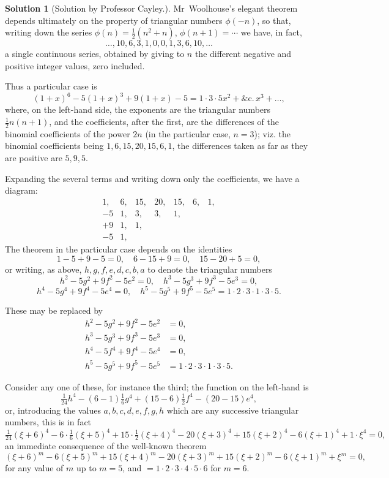 \documentclass[11pt,a4paper]{article}
\theoremstyle{definition}
\newtheorem*{solution}{Solution}
\begin{document}
\begin{solution}[Solution by Professor Cayley.]
Mr~Woolhouse's elegant theorem depends ultimately on the property of triangular numbers $\phi(-n)$, so that, writing down the series $\phi(n) = \frac{1}{2}(n^2+n)$, $\phi(n+1) = \cdots$ we have, in fact,
\[
\ldots, 10, 6, 3, 1, 0, 0, 1, 3, 6, 10, \ldots
\]
a single continuous series, obtained by giving to $n$ the different negative and positive integer values, zero included.

Thus a particular case is
\[
(1+x)^6 - 5(1+x)^3 + 9(1+x) - 5 = 1 \cdot 3 \cdot 5x^2 + \&\text{c.}\,x^3 + \ldots,
\]
where, on the left-hand side, the exponents are the triangular numbers $\frac{1}{2}n(n+1)$, and the coefficients, after the first, are the differences of the binomial coefficients of the power $2n$ (in the particular case, $n=3$); viz. the binomial coefficients being $1, 6, 15, 20, 15, 6, 1$, the differences taken as far as they are positive are $5, 9, 5$.

Expanding the several terms and writing down only the coefficients, we have a diagram:
\[
\begin{array}{rrrrrrr}
1, & 6, & 15, & 20, & 15, & 6, & 1, \\
-5 & 1, & 3, & 3, & 1, \\ 
+9 & 1, & 1, \\-5 & 1,
\end{array}
\]
The theorem in the particular case depends on the identities
\[
1-5+9-5 = 0, \quad 6-15+9=0, \quad 15-20+5=0,
\]
or writing, as above, $h,g,f,e,d,c,b,a$ to denote the triangular numbers
\[
h^2-5g^2+9f^2-5e^2=0, \quad h^3-5g^3+9f^3-5e^3=0,
\]
\[
h^4-5g^4+9f^4-5e^4=0, \quad h^5-5g^5+9f^5-5e^5=1\cdot2\cdot3\cdot1\cdot3\cdot5.
\]

These may be replaced by
\[
\begin{aligned}
h^2-5g^2+9f^2-5e^2 &= 0, \\
h^3-5g^3+9f^3-5e^3 &= 0, \\
h^4-5f^4+9f^4-5e^4 &= 0, \\
h^5-5g^5+9f^5-5e^5 &= 1\cdot2\cdot3\cdot1\cdot3\cdot5.
\end{aligned}
\]

Consider any one of these, for instance the third; the function on the left-hand is
\[
\tfrac{1}{24}h^4 - (6-1)\tfrac{1}{6}g^4 + (15-6)\tfrac{1}{2}f^4 - (20-15)e^4,
\]
or, introducing the values $a,b,c,d,e,f,g,h$ which are any successive triangular numbers, this is in fact
\[
\tfrac{1}{24}(\xi+6)^4 - 6\cdot\tfrac{1}{6}(\xi+5)^4 + 15\cdot\tfrac{1}{2}(\xi+4)^4 - 20(\xi+3)^4 + 15(\xi+2)^4 - 6(\xi+1)^4 + 1\cdot\xi^4 = 0,
\]
an immediate consequence of the well-known theorem
\[
(\xi+6)^m - 6(\xi+5)^m + 15(\xi+4)^m - 20(\xi+3)^m + 15(\xi+2)^m - 6(\xi+1)^m + \xi^m = 0,
\]
for any value of $m$ up to $m=5$, and $= 1\cdot2\cdot3\cdot4\cdot5\cdot6$ for $m=6$.


\end{solution}
\end{document}
